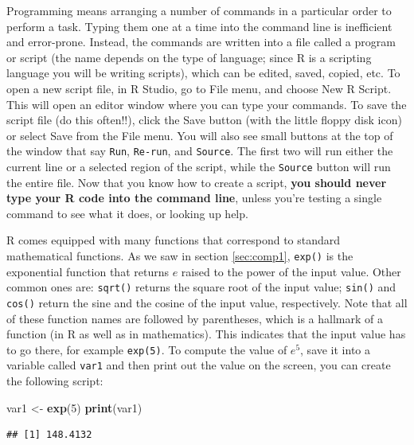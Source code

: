 \documentclass[
]{book}
\newenvironment{Shaded}{\begin{snugshade}}{\end{snugshade}}
\newcommand{\DecValTok}[1]{\textcolor[rgb]{0.00,0.00,0.81}{#1}}
\newcommand{\KeywordTok}[1]{\textcolor[rgb]{0.13,0.29,0.53}{\textbf{#1}}}
\newcommand{\NormalTok}[1]{#1}
\newcommand{\StringTok}[1]{\textcolor[rgb]{0.31,0.60,0.02}{#1}}
\theoremstyle{definition}
\theoremstyle{definition}
\theoremstyle{definition}
\theoremstyle{remark}
\begin{document}
Programming means arranging a number of commands in a particular order to perform a task. Typing them one at a time into the command line is inefficient and error-prone. Instead, the commands are written into a file called a program or script (the name depends on the type of language; since R is a scripting language you will be writing scripts), which can be edited, saved, copied, etc. To open a new script file, in R Studio, go to File menu, and choose New R Script. This will open an editor window where you can type your commands. To save the script file (do this often!!), click the Save button (with the little floppy disk icon) or select Save from the File menu. You will also see small buttons at the top of the window that say \texttt{Run}, \texttt{Re-run}, and \texttt{Source}. The first two will run either the current line or a selected region of the script, while the \texttt{Source} button will run the entire file. Now that you know how to create a script, \textbf{you should never type your R code into the command line}, unless you're testing a single command to see what it does, or looking up help.

R comes equipped with many   functions that correspond to standard mathematical functions. As we saw in section \ref{sec:comp1}, \texttt{exp()} is the exponential function that returns \(e\) raised to the power of the input value. Other common ones are: \texttt{sqrt()} returns the square root of the input value; \texttt{sin()} and \texttt{cos()} return the sine and the cosine of the input value, respectively. Note that all of these function names are followed by parentheses, which is a hallmark of a function (in R as well as in mathematics). This indicates that the input value has to go there, for example \texttt{exp(5)}. To compute the value of \(e^5\), save it into a variable called \texttt{var1} and then print out the value on the screen, you can create the following script:

\begin{Shaded}
\begin{Highlighting}[]
\NormalTok{var1 \textless{}{-}}\StringTok{ }\KeywordTok{exp}\NormalTok{(}\DecValTok{5}\NormalTok{)}
\KeywordTok{print}\NormalTok{(var1)}
\end{Highlighting}
\end{Shaded}

\begin{verbatim}
## [1] 148.4132
\end{verbatim}
\end{document}
